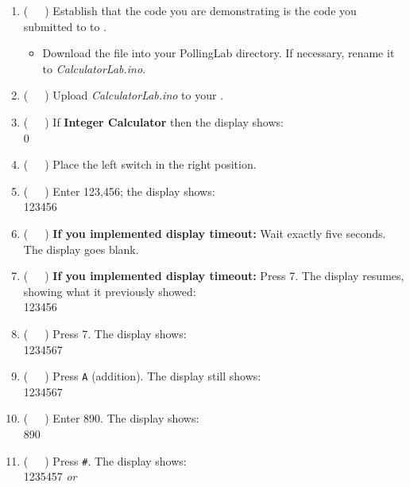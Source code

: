\begin{enumerate}
\item (\ \ \ ) Establish that the code you are demonstrating is the code you
    submitted to to \filesubmission.
    \begin{itemize}
    \item Download the file into your PollingLab directory. If necessary,
        rename it to \textit{CalculatorLab.ino}.
    \end{itemize}
\item (\ \ \ ) Upload \textit{CalculatorLab.ino} to your \nano.
\item (\ \ \ ) If \textbf{Integer Calculator} then the display shows: \\
    {\dviiseg \phantom{8888888}0} \\
\item (\ \ \ ) Place the left switch in the right position.
\item (\ \ \ ) Enter 123,456; the display shows: \\
    {\dviiseg \phantom{88}123456}
\item (\ \ \ ) \textbf{If you implemented display timeout:} Wait exactly five
    seconds. The display goes blank.
\item (\ \ \ ) \textbf{If you implemented display timeout:} Press 7. The display
    resumes, showing what it previously showed: \\
    {\dviiseg \phantom{88}123456}
\item (\ \ \ ) Press 7. The display shows: \\
    {\dviiseg \phantom{8}1234567}
\item (\ \ \ ) Press \texttt{A} (addition). The display still shows: \\
    {\dviiseg \phantom{8}1234567}
\item (\ \ \ ) Enter 890. The display shows: \\
    {\dviiseg \phantom{88888}890}
\item (\ \ \ ) Press \texttt{\#}. The display shows: \\
    {\dviiseg \phantom{8}1235457} \hspace{1cm} \textit{or} \hspace{1cm}

\end{enumerate}
